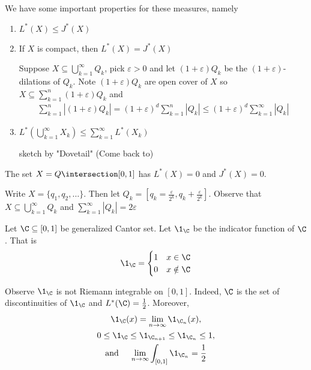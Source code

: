 \noindent We have some important properties for these measures, namely
\begin{enumerate}
	\item $L^*(X) \leq J^* (X)$
	\item If  $X$ is compact, then $L^*(X) = J^*(X)$
\begin{solution}
	Suppose $X \subseteq \bigcup_{k=1}^{\infty} Q_k$, pick $\varepsilon > 0$ and let  $(1 + \varepsilon)Q_k$ be the $(1 + \varepsilon)$-dilations of $Q_k$. Note $(1+ \varepsilon ) Q_k$ are open cover of  $X$ so $X \subseteq \sum_{k=1}^n (1+\varepsilon) Q_k$ and
	\begin{align*}
		\sum_{k=1}^{n} |(1 + \varepsilon) Q_k| = (1+\varepsilon)^d \sum_{k=1}^{n}|Q_k| \leq (1 + \varepsilon)^d \sum_{k=1}^{\infty} | Q_k|
	\end{align*}
\end{solution}

\item $L^* \left(\bigcup^{\infty}_{k = 1} X_k \right) \leq \sum_{k = 1}^{\infty} L^* (X_{k})$

\begin{solution}
	sketch by "Dovetail" (Come back to)
\end{solution}
\end{enumerate}

\begin{example}
	The set $X = Q \intersection [0,1]$ has  $L^*(X) = 0$ and  $J^*(X) = 0$.
\end{example}

\begin{example}
	Write  $X = \{q_1, q_2, \ldots \}$. Then let $Q_k = [q_k =  \frac{\varepsilon}{2^k}, q_k + \frac{\varepsilon}{2^k}]$.
	Observe that $X \subseteq \bigcup_{k = 1}^{\infty} Q_k$ and $\sum_{k=1}^{\infty} |Q_k| = 2 \varepsilon$
\end{example}

\begin{example}
	Let $\C \subseteq [0,1]$ be generalized Cantor set. Let $\1_{\C}$ be the indicator function of $\C$. That is
	\[
		\1_{\C} = \begin{cases}
			1 & x \in \C \\
			0 & x \notin \C
		\end{cases}
	\]

	Observe $\1_ {\C}$ is not Riemann integrable on $[0,1]$. Indeed, $\C$ is the set of discontinuities of $\1_{\C}$ and $L^*(\C) = \frac{1}{2}$.
	Moreover,
	\begin{gather*}
		\1_{\C}(x) = \lim_{n\to \infty} \1_{\C_n} (x), \\
		0 \leq \1_{\C} \leq \1_{\C_{n+1}} \leq \1_{\C_{n}} \leq 1, \\
		\text{and } \quad \lim_{n \to \infty} \int_{[0,1]} \1_{\C_{n}} = \frac{1}{2}
	\end{gather*}
\end{example}
